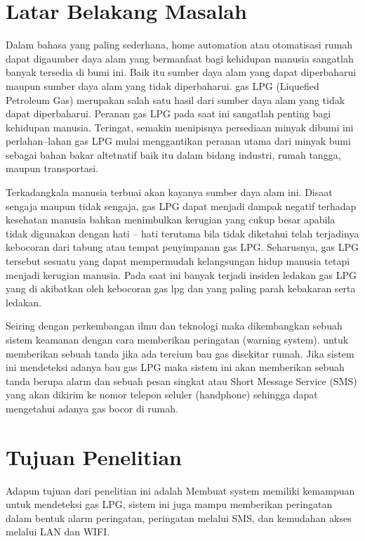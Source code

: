 \documentclass{jtetiproposalskripsi}
\begin{document}
\section{Latar Belakang Masalah}
Dalam bahasa yang paling sederhana, home automation atau otomatisasi rumah dapat digaumber daya alam yang bermanfaat bagi kehidupan manusia sangatlah banyak tersedia di bumi ini. Baik itu sumber daya alam yang dapat diperbaharui maupun sumber daya alam yang tidak diperbaharui. gas LPG (Liquefied Petroleum Gas) merupakan salah satu hasil dari sumber daya alam yang tidak dapat diperbaharui. Peranan gas LPG pada saat ini sangatlah penting bagi kehidupan manusia. Teringat, semakin menipisnya persediaan minyak dibumi ini perlahan–lahan gas LPG mulai menggantikan peranan utama dari minyak bumi sebagai bahan bakar altetnatif baik itu dalam bidang industri, rumah tangga, maupun transportasi.

Terkadangkala manusia terbuai akan kayanya sumber daya alam ini. Disaat sengaja maupun tidak sengaja, gas LPG dapat menjadi dampak negatif terhadap kesehatan manusia bahkan menimbulkan kerugian yang cukup besar apabila tidak digunakan dengan hati – hati terutama bila tidak diketahui telah terjadinya kebocoran dari tabung atau tempat penyimpanan gas LPG. Seharusnya, gas LPG tersebut sesuatu yang dapat mempermudah kelangsungan hidup manusia tetapi menjadi kerugian manusia. Pada saat ini banyak terjadi insiden ledakan gas LPG yang di akibatkan oleh kebocoran gas lpg dan yang paling parah kebakaran serta ledakan. 

Seiring dengan perkembangan ilmu dan teknologi maka dikembangkan sebuah sistem keamanan dengan cara memberikan peringatan (warning system). untuk memberikan sebuah tanda jika ada tercium bau gas disekitar rumah. Jika sistem ini mendeteksi adanya bau gas LPG maka sistem ini akan memberikan sebuah tanda berupa alarm dan sebuah pesan singkat atau Short Message Service (SMS) yang akan dikirim ke nomor telepon seluler (handphone) sehingga dapat mengetahui adanya gas bocor di rumah.
 



\section{Tujuan Penelitian}
Adapun tujuan dari penelitian ini adalah Membuat system memiliki kemampuan untuk mendeteksi gas LPG, sistem ini juga mampu memberikan peringatan dalam bentuk alarm peringatan, peringatan melalui SMS, dan kemudahan akses melalui LAN dan WIFI.
\end{document}
